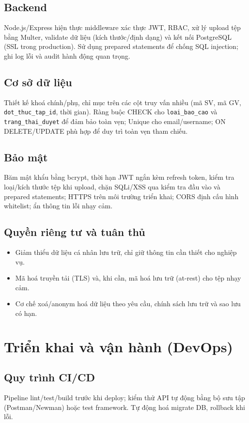 \documentclass[conference]{IEEEtran}
\begin{document}
\subsection{Backend}
Node.js/Express hiện thực middleware xác thực JWT, RBAC, xử lý upload tệp bằng Multer, validate dữ liệu (kích thước/định dạng) và kết nối PostgreSQL (SSL trong production). Sử dụng prepared statements để chống SQL injection; ghi log lỗi và audit hành động quan trọng.

\subsection{Cơ sở dữ liệu}
Thiết kế khoá chính/phụ, chỉ mục trên các cột truy vấn nhiều (mã SV, mã GV, \texttt{dot\_thuc\_tap\_id}, thời gian). Ràng buộc CHECK cho \texttt{loai\_bao\_cao} và \texttt{trang\_thai\_duyet} để đảm bảo toàn vẹn; Unique cho email/username; ON DELETE/UPDATE phù hợp để duy trì toàn vẹn tham chiếu.

\subsection{Bảo mật}
Băm mật khẩu bằng bcrypt, thời hạn JWT ngắn kèm refresh token, kiểm tra loại/kích thước tệp khi upload, chặn SQLi/XSS qua kiểm tra đầu vào và prepared statements; HTTPS trên môi trường triển khai; CORS định cấu hình whitelist; ẩn thông tin lỗi nhạy cảm.

\subsection{Quyền riêng tư và tuân thủ}
\begin{itemize}
  \item Giảm thiểu dữ liệu cá nhân lưu trữ, chỉ giữ thông tin cần thiết cho nghiệp vụ.
  \item Mã hoá truyền tải (TLS) và, khi cần, mã hoá lưu trữ (at-rest) cho tệp nhạy cảm.
  \item Cơ chế xoá/anonym hoá dữ liệu theo yêu cầu, chính sách lưu trữ và sao lưu có hạn.
\end{itemize}

\section{Triển khai và vận hành (DevOps)}
\subsection{Quy trình CI/CD}
Pipeline lint/test/build trước khi deploy; kiểm thử API tự động bằng bộ sưu tập (Postman/Newman) hoặc test framework. Tự động hoá migrate DB, rollback khi lỗi.
\end{document}
